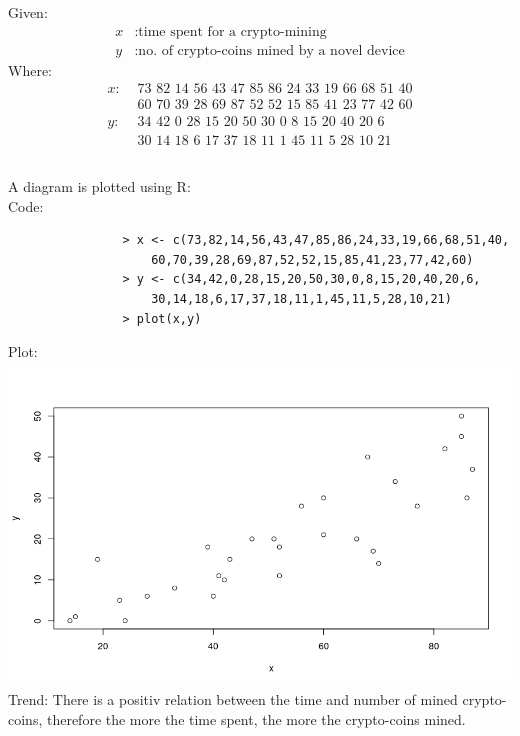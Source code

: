 \documentclass[a4paper]{article}
\begin{document}



\section{}
	Given:
		\[\begin{split}
			x &: \text{time spent for a crypto-mining}\\
			y &: \text{no. of crypto-coins mined by a novel device}
		\end{split}\]
	Where:
		\[\begin{split}
			x :& \text{ 73 82 14 56 43 47 85 86 24 33 19 66 68 51 40}\\
			 & \text{ 60 70 39 28 69 87 52 52 15 85 41 23 77 42 60}\\
			 y :& \text{ 34 42 0 28 15 20 50 30 0 8 15 20 40 20 6}\\
			 & \text{ 30 14 18 6 17 37 18 11 1 45 11 5 28 10 21}
		\end{split}\]
	
	\subsection{}
		A diagram is plotted using R:\\
			Code:
			\begin{verbatim}
				> x <- c(73,82,14,56,43,47,85,86,24,33,19,66,68,51,40,
					60,70,39,28,69,87,52,52,15,85,41,23,77,42,60)
				> y <- c(34,42,0,28,15,20,50,30,0,8,15,20,40,20,6,
					30,14,18,6,17,37,18,11,1,45,11,5,28,10,21)
				> plot(x,y)
			\end{verbatim}
		Plot:\\
			\includegraphics[width=\textwidth]{Rplot1A.png}
		Trend: There is a positiv relation between the time and number of mined crypto-coins, therefore the more the time spent, the more the crypto-coins mined.
	
\end{document}

